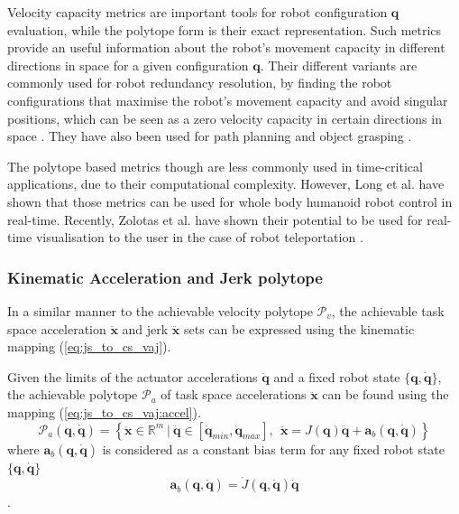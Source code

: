 Velocity capacity metrics are important tools for robot configuration $\bm{q}$ evaluation, while the polytope form is their exact representation. Such metrics provide an useful information about the robot's movement capacity in different directions in space for a given configuration $\bm{q}$. Their different variants are commonly used for robot redundancy resolution, by finding the robot configurations that maximise the robot's movement capacity and avoid singular positions\cite{Marani2002,Thygeson2017}, which can be seen as a zero velocity capacity in certain directions in space \cite{merlet_jacobian_2006}.  They have also been used for path planning \cite{Pardi2020,Nagatani2002} and object grasping \cite{Fei2019,XU2021300}. 

The polytope based metrics though are less commonly used in time-critical applications, due to their computational complexity. However, Long et al. have shown that those metrics can be used for whole body humanoid robot control \cite{long_constrained_2020} in real-time. Recently, Zolotas et al. have shown their potential to be used for real-time visualisation to the user in the case of robot teleportation \cite{Zolotas2021}. 

\subsubsection{Kinematic Acceleration and Jerk polytope}\label{ch:kin_accel_jerk}
In a similar manner to the achievable velocity polytope $\mathcal{P}_v$, the achievable task space acceleration $\ddot{\bm{x}}$ and jerk $\dddot{\bm{x}}$ sets can be expressed using the kinematic mapping (\ref{eq:js_to_cs_vaj}). 

Given the limits of the actuator accelerations $\ddot{\bm{q}}$ and a fixed robot state $\{\bm{q},\dot{\bm{q}}\}$, the achievable polytope $\mathcal{P}_a$ of task space accelerations $\ddot{\bm{x}}$ can be found using the mapping (\ref{eq:js_to_cs_vaj:accel}).
\begin{equation}
    \mathcal{P}_a(\bm{q}, \dot{\bm{q}}) = \left\{ \ddot{\bm{x}} \in \mathbb{R}^m ~|~ \ddot{\bm{q}}\in\left[\ddot{\bm{q}}_{min}, \ddot{\bm{q}}_{max} \right], ~~ \ddot{\bm{x}} = J(\bm{q})\ddot{\bm{q}} + \bm{a}_b(\bm{q}, \dot{\bm{q}})  \right\}
    \label{eq:poly_accel_kin}
\end{equation}
where $\bm{a}_b(\bm{q}, \dot{\bm{q}})$ is considered as a constant bias term for any fixed robot state $\{\bm{q},\dot{\bm{q}}\}$
\begin{equation}
    \bm{a}_b(\bm{q}, \dot{\bm{q}}) = \dot{J}(\bm{q},\dot{\bm{q}})\dot{\bm{q}}
\end{equation}.

